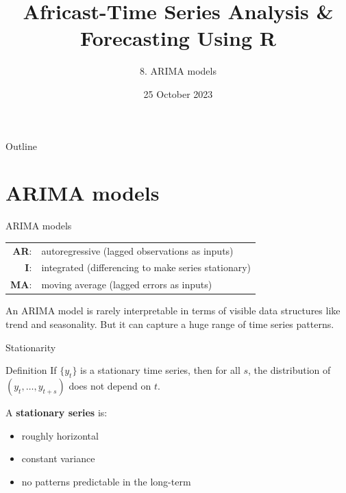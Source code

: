 \documentclass[
  14pt,
  ignorenonframetext,
  aspectratio=169,
]{beamer}
\title{Africast-Time Series Analysis \& Forecasting Using R}
\subtitle{8. ARIMA models}
\author{}
\date{25 October 2023}
\providecommand{\tightlist}{%
  \setlength{\itemsep}{0pt}\setlength{\parskip}{0pt}}\usepackage{longtable,booktabs,array}
\begin{document}
\frame{\titlepage}
\begin{frame}{Outline}
\protect\hypertarget{outline}{}
\vspace*{0.7cm}\tableofcontents
\end{frame}

\hypertarget{arima-models}{%
\section{ARIMA models}\label{arima-models}}

\begin{frame}{ARIMA models}
\protect\hypertarget{arima-models-1}{}
\begin{tabular}{rl}
\textbf{AR}: & autoregressive (lagged observations as inputs)\\
\textbf{I}: & integrated (differencing to make series stationary)\\
\textbf{MA}: & moving average (lagged errors as inputs)
\end{tabular}

\pause

\begin{block}{}
\protect\hypertarget{section}{}
An ARIMA model is rarely interpretable in terms of visible data
structures like trend and seasonality. But it can capture a huge range
of time series patterns.
\end{block}
\end{frame}

\begin{frame}{Stationarity}
\protect\hypertarget{stationarity}{}
\begin{block}{Definition}
If $\{y_t\}$ is a stationary time series, then for all $s$, the distribution of $(y_t,\dots,y_{t+s})$ does not depend on $t$.
\end{block}\pause

A \textbf{stationary series} is:

\begin{itemize}
\tightlist
\item
  roughly horizontal
\item
  constant variance
\item
  no patterns predictable in the long-term
\end{itemize}
\end{frame}
\end{document}

